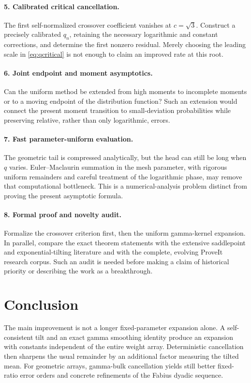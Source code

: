 \documentclass[11pt,a4paper]{article}
\numberwithin{equation}{section}
\theoremstyle{definition}\newtheorem{definition}[theorem]{Definition}
\theoremstyle{remark}\newtheorem{remark}[theorem]{Remark}
\begin{document}
\paragraph{5. Calibrated critical cancellation.}
The first self-normalized crossover coefficient vanishes at $c=\sqrt3$. Construct a precisely calibrated $q_n$, retaining the necessary logarithmic and constant corrections, and determine the first nonzero residual. Merely choosing the leading scale in \eqref{eq:qcritical} is not enough to claim an improved rate at this root.

\paragraph{6. Joint endpoint and moment asymptotics.}
Can the uniform method be extended from high moments to incomplete moments or to a moving endpoint of the distribution function? Such an extension would connect the present moment transition to small-deviation probabilities while preserving relative, rather than only logarithmic, errors.

\paragraph{7. Fast parameter-uniform evaluation.}
The geometric tail is compressed analytically, but the head can still be long when $q$ varies. Euler--Maclaurin summation in the mesh parameter, with rigorous uniform remainders and careful treatment of the logarithmic phase, may remove that computational bottleneck. This is a numerical-analysis problem distinct from proving the present asymptotic formula.

\paragraph{8. Formal proof and novelty audit.}
Formalize the crossover criterion first, then the uniform gamma-kernel expansion. In parallel, compare the exact theorem statements with the extensive saddlepoint and exponential-tilting literature and with the complete, evolving ProveIt research corpus. Such an audit is needed before making a claim of historical priority or describing the work as a breakthrough.

\section{Conclusion}
The main improvement is not a longer fixed-parameter expansion alone. A self-consistent tilt and an exact gamma smoothing identity produce an expansion with constants independent of the entire weight array. Deterministic cancellation then sharpens the usual remainder by an additional factor measuring the tilted mean. For geometric arrays, gamma-bulk cancellation yields still better fixed-ratio error orders and concrete refinements of the Fabius dyadic sequence.
\end{document}

